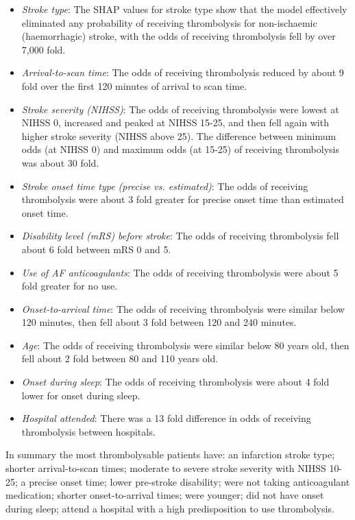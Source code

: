 \begin{itemize}
    \item \emph{Stroke type}: The SHAP values for stroke type show that the model effectively eliminated any probability of receiving thrombolysis for non-ischaemic (haemorrhagic) stroke, with the odds of receiving thrombolysis fell by over 7,000 fold.
    \item \emph{Arrival-to-scan time}: The odds of receiving thrombolysis reduced by about 9 fold over the first 120 minutes of arrival to scan time.
    \item \emph{Stroke severity (NIHSS)}: The odds of receiving thrombolysis were lowest at NIHSS 0, increased and peaked at NIHSS 15-25, and then fell again with higher stroke severity (NIHSS above 25). The difference between minimum odds (at NIHSS 0) and maximum odds (at 15-25) of receiving thrombolysis was about 30 fold.
    \item \emph{Stroke onset time type (precise vs. estimated)}: The odds of receiving thrombolysis were about 3 fold greater for precise onset time than estimated onset time.
    \item \emph{Disability level (mRS) before stroke}: The odds of receiving thrombolysis fell about 6 fold between mRS 0 and 5.
    \item \emph{Use of AF anticoagulants}: The odds of receiving thrombolysis were about 5 fold greater for no use.
    \item \emph{Onset-to-arrival time}: The odds of receiving thrombolysis were similar below 120 minutes, then fell about 3 fold between 120 and 240 minutes.
    \item \emph{Age}: The odds of receiving thrombolysis were similar below 80 years old, then fell about 2 fold between 80 and 110 years old.    
    \item \emph{Onset during sleep}: The odds of receiving thrombolysis were about 4 fold lower for onset during sleep.
    \item \emph{Hospital attended}: There was a 13 fold difference in odds of receiving thrombolysis between hospitals.
\end{itemize}

In summary the most thrombolysable patients have: an infarction stroke type; shorter arrival-to-scan times; moderate to severe stroke severity with NIHSS 10-25; a precise onset time; lower pre-stroke disability; were not taking anticoagulant medication; shorter onset-to-arrival times; were younger; did not have onset during sleep; attend a hospital with a high predisposition to use thrombolysis.

